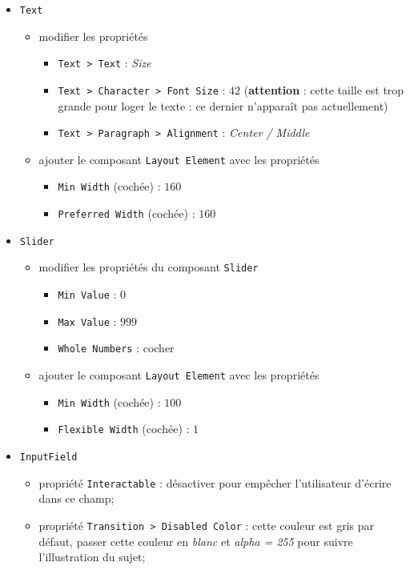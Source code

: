 \documentclass[a4paper,10pt]{article}
\newenvironment{solution}%
{\begin{tcolorbox}[breakable,colback=red!5!white,colframe=red!75!black,title=Solution]}%
{\end{tcolorbox}}
\begin{document}
\begin{solution}
\begin{itemize} 
\item \texttt{Text}
	\begin{itemize} 	
		\item modifier les propriétés
		\begin{itemize} 	
			\item \texttt{Text > Text} : \textit{Size}
			\item \texttt{Text > Character > Font Size} : $42$ (\textbf{attention} : cette taille est trop grande pour loger le texte : ce dernier n'apparaît pas actuellement)
			\item \texttt{Text > Paragraph > Alignment} : \textit{Center / Middle}
		\end{itemize}	
		\item ajouter le composant \texttt{Layout Element} avec les propriétés
		\begin{itemize} 	
			\item \texttt{Min Width} (cochée) : $160$
			\item \texttt{Preferred Width} (cochée) : $160$
		\end{itemize}	
	\end{itemize}
\item \texttt{Slider}
\begin{itemize} 	
	\item modifier les propriétés du composant \texttt{Slider}
	\begin{itemize}
		\item \texttt{Min Value} : $0$
		\item \texttt{Max Value} : $999$
		\item \texttt{Whole Numbers} : cocher
	\end{itemize}			
	\item ajouter le composant \texttt{Layout Element} avec les propriétés
	\begin{itemize}
		\item \texttt{Min Width} (cochée) : $100$
		\item \texttt{Flexible Width} (cochée) : $1$
	\end{itemize}	
\end{itemize}
\item \texttt{InputField}
	\begin{itemize} 	
		\item propriété \texttt{Interactable} : désactiver pour empêcher l'utilisateur d'écrire dans ce champ;
		\item propriété \texttt{Transition > Disabled Color} : cette couleur est gris par défaut, passer cette couleur en \textit{blanc} et \textit{alpha = 255} pour suivre l'illustration du sujet;

\end{itemize}
\end{itemize}
\end{solution}
\end{document}
